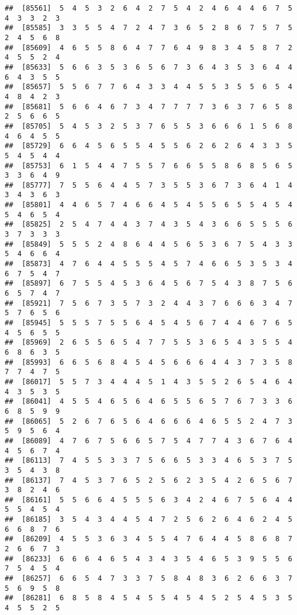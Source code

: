 \documentclass[
]{book}
\begin{document}
\begin{verbatim}
##  [85561]  5  4  5  3  2  6  4  2  7  5  4  2  4  6  4  4  6  7  5  4  3  3  2  3
##  [85585]  3  3  5  5  4  7  2  4  7  3  6  5  2  8  6  7  5  7  5  2  4  5  6  8
##  [85609]  4  6  5  5  8  6  4  7  7  6  4  9  8  3  4  5  8  7  2  4  5  5  2  4
##  [85633]  5  6  6  3  5  3  6  5  6  7  3  6  4  3  5  3  6  4  4  6  4  3  5  5
##  [85657]  5  5  6  7  7  6  4  3  3  4  4  5  5  3  5  5  6  5  4  4  8  4  2  3
##  [85681]  5  6  6  4  6  7  3  4  7  7  7  7  3  6  3  7  6  5  8  2  5  6  6  5
##  [85705]  5  4  5  3  2  5  3  7  6  5  5  3  6  6  6  1  5  6  8  4  6  4  5  5
##  [85729]  6  6  4  5  6  5  5  4  5  5  6  2  6  2  6  4  3  3  5  5  4  5  4  4
##  [85753]  6  1  5  4  4  7  5  5  7  6  6  5  5  8  6  8  5  6  5  3  3  6  4  9
##  [85777]  7  5  5  6  4  4  5  7  3  5  5  3  6  7  3  6  4  1  4  3  4  3  6  3
##  [85801]  4  4  6  5  7  4  6  6  4  5  4  5  5  6  5  5  4  5  4  5  4  6  5  4
##  [85825]  2  5  4  7  4  4  3  7  4  3  5  4  3  6  6  5  5  5  6  3  7  3  3  3
##  [85849]  5  5  5  2  4  8  6  4  4  5  6  5  3  6  7  5  4  3  3  5  4  6  6  4
##  [85873]  4  7  6  4  4  5  5  5  4  5  7  4  6  6  5  3  5  3  4  6  7  5  4  7
##  [85897]  6  7  5  5  4  5  3  6  4  5  6  7  5  4  3  8  7  5  6  6  5  7  4  7
##  [85921]  7  5  6  7  3  5  7  3  2  4  4  3  7  6  6  6  3  4  7  5  7  6  5  6
##  [85945]  5  5  5  7  5  5  6  4  5  4  5  6  7  4  4  6  7  6  5  4  5  6  5  5
##  [85969]  2  6  5  5  6  5  4  7  7  5  5  3  6  5  4  3  5  5  4  6  8  6  3  5
##  [85993]  6  6  5  6  8  4  5  4  5  6  6  6  4  4  3  7  3  5  8  7  7  4  7  5
##  [86017]  5  5  7  3  4  4  4  5  1  4  3  5  5  2  6  5  4  6  4  4  3  5  3  5
##  [86041]  4  5  5  4  6  5  6  4  6  5  5  6  5  7  6  7  3  3  6  6  8  5  9  9
##  [86065]  5  2  6  7  6  5  6  4  6  6  6  4  6  5  5  2  4  7  3  5  9  5  6  4
##  [86089]  4  7  6  7  5  6  6  5  7  5  4  7  7  4  3  6  7  6  4  4  5  6  7  4
##  [86113]  7  4  5  5  3  3  7  5  6  6  5  3  3  4  6  5  3  7  5  3  5  4  3  8
##  [86137]  7  4  5  3  7  6  5  2  5  6  2  3  5  4  2  6  5  6  7  3  8  2  4  6
##  [86161]  5  5  6  6  4  5  5  5  6  3  4  2  4  6  7  5  6  4  4  5  5  4  5  4
##  [86185]  3  5  4  3  4  4  5  4  7  2  5  6  2  6  4  6  2  4  5  6  6  8  7  6
##  [86209]  4  5  5  3  6  3  4  5  5  4  7  6  4  4  5  8  6  8  7  2  6  6  7  3
##  [86233]  6  6  6  4  6  5  4  3  4  3  5  4  6  5  3  9  5  5  6  7  5  4  5  4
##  [86257]  6  6  5  4  7  3  3  7  5  8  4  8  3  6  2  6  6  3  7  5  6  9  5  8
##  [86281]  6  8  5  8  4  5  4  5  5  4  5  4  5  2  5  4  5  3  5  4  5  5  2  5

\end{verbatim}
\end{document}
